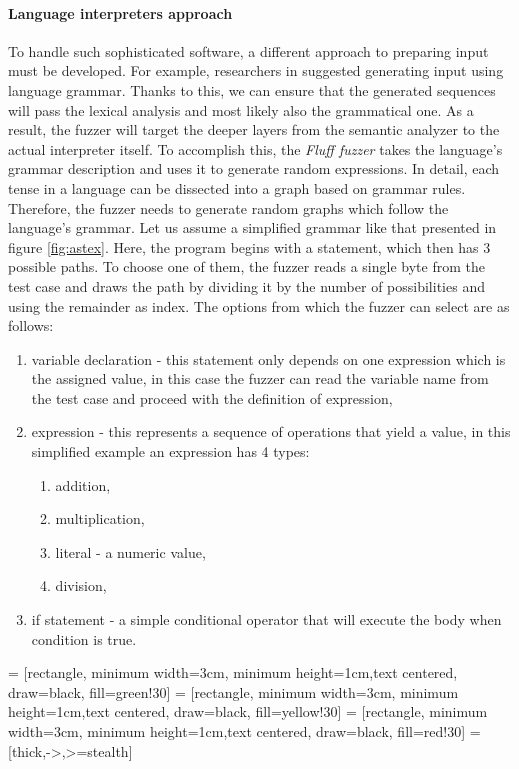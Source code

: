 \paragraph{Language interpreters approach}
To handle such sophisticated software, a different approach to preparing input must be developed. For example, researchers in \cite{dominiak2019efficient} suggested generating input using language grammar. Thanks to this, we can ensure that the generated sequences will pass the lexical analysis and most likely also the grammatical one. As a result, the fuzzer will target the deeper layers from the semantic analyzer to the actual interpreter itself. To accomplish this, the \textit{Fluff fuzzer} takes the language's grammar description and uses it to generate random expressions. In detail, each tense in a language can be dissected into a graph based on grammar rules. Therefore, the fuzzer needs to generate random graphs which follow the language's grammar. Let us assume a simplified grammar like that presented in figure \ref{fig:astex}. Here, the program begins with a statement, which then has 3 possible paths. To choose one of them, the fuzzer reads a single byte from the test case and draws the path by dividing it by the number of possibilities and using the remainder as index. The options from which the fuzzer can select are as follows:
\begin{enumerate}
    \item variable declaration - this statement only depends on one expression which is the assigned value, in this case the fuzzer can read the variable name from the test case and proceed with the definition of expression,
    \item expression - this represents a sequence of operations that yield a value, in this simplified example an expression has 4 types:
    \begin{enumerate}
        \item addition,
        \item multiplication,
        \item literal - a numeric value,
        \item division,
    \end{enumerate}
    \item if statement - a simple conditional operator that will execute the body when condition is true.
\end{enumerate}

 = [rectangle, minimum width=3cm, minimum height=1cm,text centered, draw=black, fill=green!30]
 = [rectangle, minimum width=3cm, minimum height=1cm,text centered, draw=black, fill=yellow!30]
 = [rectangle, minimum width=3cm, minimum height=1cm,text centered, draw=black, fill=red!30]
 = [thick,->,>=stealth]

